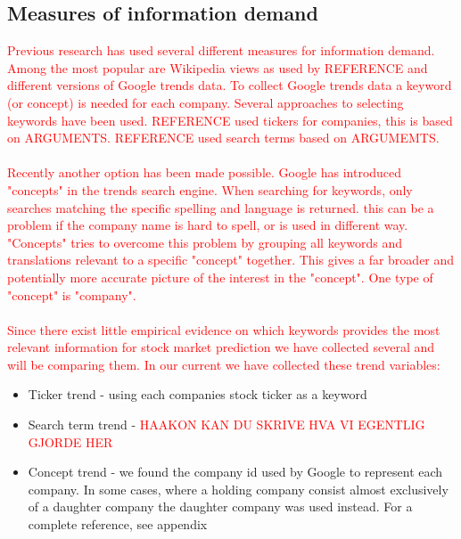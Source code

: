 \subsection{Measures of information demand}
\textcolor{red}{ Previous research has used several different measures for information demand. Among the most popular are Wikipedia views as used by REFERENCE and different versions of Google trends data. To collect Google trends data a keyword (or concept) is needed for each company. Several approaches to selecting keywords have been used. REFERENCE used tickers for companies, this is based on ARGUMENTS. REFERENCE used search terms based on ARGUMEMTS. }
\\\\
\textcolor{red}{ Recently another option has been made possible. Google has introduced "concepts" in the trends search engine. When searching for keywords, only searches matching the specific spelling and language is returned. this can be a problem if the company name is hard to spell, or is used in different way. "Concepts" tries to overcome this problem by grouping all keywords and translations relevant to a specific "concept" together. This gives a far broader and potentially more accurate picture of the interest in the "concept". One type of "concept" is "company". \ }
\\\\
\textcolor{red}{ Since there exist little empirical evidence on which keywords provides the most relevant information for stock market prediction we have collected several and will be comparing them. In our current we have collected these trend variables: }
\begin{itemize}
\item Ticker trend - using each companies stock ticker as a keyword
\item Search term trend - \textcolor{red}{ HAAKON KAN DU SKRIVE HVA VI EGENTLIG GJORDE HER}
\item Concept trend - we found the company id used by Google to represent each company. In some cases, where a holding company consist almost exclusively of a daughter company the daughter company was used instead. For a complete reference, see appendix
\end{itemize}

